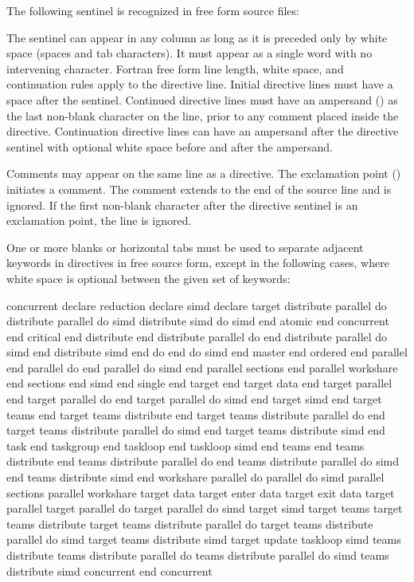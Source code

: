 \begin{fortranspecific}
The following sentinel is recognized in free form source files:


The sentinel can appear in any column as long as it is preceded only by white space
(spaces and tab characters). It must appear as a single word with no intervening
character. Fortran free form line length, white space, and continuation rules apply to the
directive line. Initial directive lines must have a space after the sentinel. Continued
directive lines must have an ampersand (\code{&}) as the last non-blank character on the line,
prior to any comment placed inside the directive. Continuation directive lines can have
an ampersand after the directive sentinel with optional white space before and after the
ampersand.

Comments may appear on the same line as a directive. The exclamation point (\code{!})
initiates a comment. The comment extends to the end of the source line and is ignored.
If the first non-blank character after the directive sentinel is an exclamation point, the
line is ignored.

One or more blanks or horizontal tabs must be used to separate adjacent keywords in
directives in free source form, except in the following cases, where white space is
optional between the given set of keywords:

\begin{indentedcodelist}
concurrent
declare reduction
declare simd
declare target
distribute parallel do
distribute parallel do simd
distribute simd
do simd
end atomic
end concurrent
end critical
end distribute
end distribute parallel do
end distribute parallel do simd
end distribute simd
end do
end do simd
end master
end ordered
end parallel
end parallel do
end parallel do simd
end parallel sections
end parallel workshare
end sections
end simd
end single
end target
end target data
end target parallel
end target parallel do
end target parallel do simd
end target simd
end target teams
end target teams distribute
end target teams distribute parallel do
end target teams distribute parallel do simd
end target teams distribute simd
end task
end taskgroup
end taskloop
end taskloop simd
end teams
end teams distribute
end teams distribute parallel do
end teams distribute parallel do simd
end teams distribute simd
end workshare
parallel do
parallel do simd
parallel sections
parallel workshare
target data
target enter data
target exit data
target parallel
target parallel do
target parallel do simd
target simd
target teams
target teams distribute
target teams distribute parallel do
target teams distribute parallel do simd
target teams distribute simd
target update
taskloop simd
teams distribute
teams distribute parallel do
teams distribute parallel do simd
teams distribute simd
concurrent
end concurrent
\end{indentedcodelist}


\end{fortranspecific}
